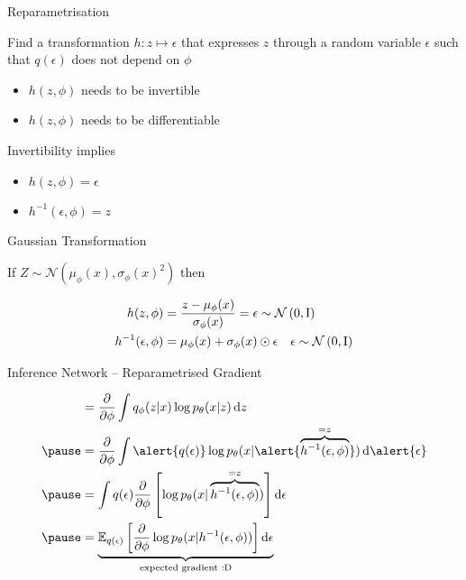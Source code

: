 \begin{frame}{Reparametrisation}

Find a transformation $ h: z \mapsto \epsilon $ that expresses $z$ through a random variable $\epsilon$ such that \alert{ $q(\epsilon)$ does not depend on $\phi $} \pause
\begin{itemize}
\item $ h(z,\phi) $ needs to be invertible \pause
\item $ h(z,\phi) $ needs to be differentiable
\pause
\end{itemize}
Invertibility implies
\begin{itemize}
\item $ h(z,\phi) = \epsilon $
\item $ h^{-1}(\epsilon,\phi) = z $ 
\end{itemize}


\end{frame}

\begin{frame}{Gaussian Transformation}

If $Z \sim \mathcal N(\mu_\phi(x), \sigma_\phi(x)^2)$ then

\begin{align*}
h(z,\phi) &= \frac{z - \mu_\phi(x)}{ \sigma_\phi(x) } = \epsilon \sim \mathcal{N}\left(0,\operatorname{I}\right) \\
h^{-1}(\epsilon,\phi) &= \mu_\phi(x) + \sigma_\phi(x) \odot \epsilon~~~\epsilon \sim \mathcal{N}\left(0,\operatorname{I}\right)
\end{align*}


\end{frame}

\begin{frame}[plain]{Inference Network -- Reparametrised Gradient}

\begin{equation*}
\begin{aligned}
&= \pdv{\phi} \int q_\phi(z|x)\log p_\theta(x|z) \dd{z} \\ \pause
&= \pdv{\phi} \int \alert{q(\epsilon)} \log p_\theta(x | \alert{\overbrace{h^{-1}(\epsilon,\phi)}^{=z}}) \dd{\alert{\epsilon}} \\ \pause
&= \int q(\epsilon) \pdv{\phi} \left[ \log p_\theta(x| \overbrace{h^{-1}(\epsilon,\phi)}^{=z})\right] \dd{\epsilon} \\ \pause
&= \underbrace{\mathbb E_{q(\epsilon)}\left[ \pdv{\phi} \log p_\theta(x| h^{-1}(\epsilon,\phi))\right] \dd{\epsilon}}_{\text{expected gradient :D}} 
\end{aligned}
\end{equation*}
\end{frame}


